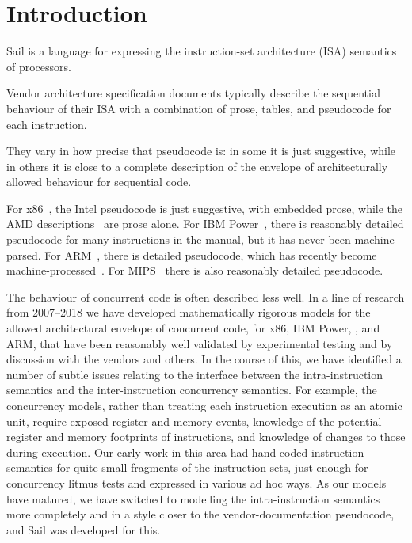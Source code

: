 \section{Introduction}
\label{sec:intro}

Sail is a language for expressing the instruction-set
architecture (ISA) semantics of processors.

Vendor architecture specification documents typically describe the
sequential behaviour of their ISA with a combination of prose, tables,
and pseudocode for each instruction.

They vary in how precise that pseudocode is: in some it is just
suggestive, while in others it is close to a complete description of
the envelope of architecturally allowed behaviour for sequential code.

For x86~\cite{Intel61}, the Intel pseudocode is just suggestive, with
embedded prose, while the AMD descriptions~\cite{AMD_3_21} are prose
alone.  For IBM Power~\cite{Power2.06}, there is reasonably detailed
pseudocode for many instructions in the manual, but it has never been
machine-parsed.  For ARM~\cite{armarmv8}, there is detailed
pseudocode, which has recently become machine-processed~\cite{Reid16}.
For MIPS~\cite{MIPS64-II,MIPS64-III} there is also reasonably detailed
pseudocode.

The behaviour of concurrent code is often described less well.  In a
line of research from 2007--2018 we have developed mathematically
rigorous models for the allowed architectural envelope of concurrent
code, for x86, IBM Power, \riscv, and ARM, that have been reasonably
well validated by experimental testing and by discussion with the
vendors and
others.
In the course of this, we have identified a number of subtle issues
relating to the interface between the intra-instruction semantics and
the inter-instruction concurrency
semantics. For
example, the concurrency models, rather than treating each instruction
execution as an atomic unit, require exposed register and memory
events, knowledge of the potential register and memory footprints of
instructions, and knowledge of changes to those during execution.  Our
early work in this area had hand-coded instruction semantics for quite
small fragments of the instruction sets, just enough for concurrency
litmus tests and expressed in various ad hoc ways. As our models have
matured, we have switched to modelling the intra-instruction semantics
more completely and in a style closer to the vendor-documentation
pseudocode, and Sail was developed for this.


